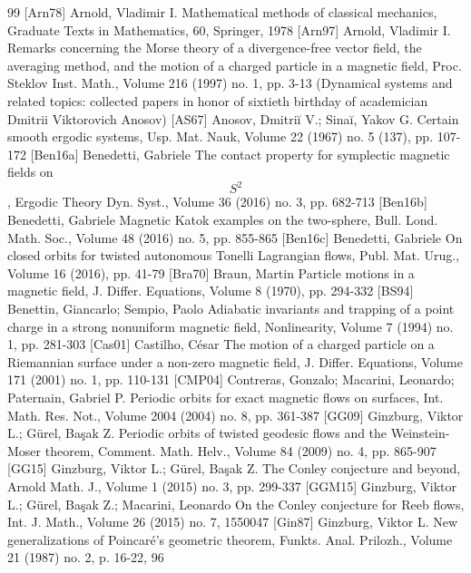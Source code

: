 \begin{thebibliography}{99}
 [Arn78] Arnold, Vladimir I. Mathematical methods of classical mechanics, Graduate Texts in Mathematics, 60, Springer, 1978
 [Arn97] Arnold, Vladimir I. Remarks concerning the Morse theory of a divergence-free vector field, the averaging method, and the motion of a charged particle in a magnetic field, Proc. Steklov Inst. Math., Volume 216 (1997) no. 1, pp. 3-13 (Dynamical systems and related topics: collected papers in honor of sixtieth birthday of academician Dmitrii Viktorovich Anosov)
 [AS67] Anosov, Dmitriĭ V.; Sinaĭ, Yakov G. Certain smooth ergodic systems, Usp. Mat. Nauk, Volume 22 (1967) no. 5 (137), pp. 107-172
 [Ben16a] Benedetti, Gabriele The contact property for symplectic magnetic fields on $${S}^2$$, Ergodic Theory Dyn. Syst., Volume 36 (2016) no. 3, pp. 682-713
 [Ben16b] Benedetti, Gabriele Magnetic Katok examples on the two-sphere, Bull. Lond. Math. Soc., Volume 48 (2016) no. 5, pp. 855-865
 [Ben16c] Benedetti, Gabriele On closed orbits for twisted autonomous Tonelli Lagrangian flows, Publ. Mat. Urug., Volume 16 (2016), pp. 41-79
 [Bra70] Braun, Martin Particle motions in a magnetic field, J. Differ. Equations, Volume 8 (1970), pp. 294-332
 [BS94] Benettin, Giancarlo; Sempio, Paolo Adiabatic invariants and trapping of a point charge in a strong nonuniform magnetic field, Nonlinearity, Volume 7 (1994) no. 1, pp. 281-303
 [Cas01] Castilho, César The motion of a charged particle on a Riemannian surface under a non-zero magnetic field, J. Differ. Equations, Volume 171 (2001) no. 1, pp. 110-131
 [CMP04] Contreras, Gonzalo; Macarini, Leonardo; Paternain, Gabriel P. Periodic orbits for exact magnetic flows on surfaces, Int. Math. Res. Not., Volume 2004 (2004) no. 8, pp. 361-387
 [GG09] Ginzburg, Viktor L.; Gürel, Başak Z. Periodic orbits of twisted geodesic flows and the Weinstein-Moser theorem, Comment. Math. Helv., Volume 84 (2009) no. 4, pp. 865-907
 [GG15] Ginzburg, Viktor L.; Gürel, Başak Z. The Conley conjecture and beyond, Arnold Math. J., Volume 1 (2015) no. 3, pp. 299-337
 [GGM15] Ginzburg, Viktor L.; Gürel, Başak Z.; Macarini, Leonardo On the Conley conjecture for Reeb flows, Int. J. Math., Volume 26 (2015) no. 7, 1550047
 [Gin87] Ginzburg, Viktor L. New generalizations of Poincaré’s geometric theorem, Funkts. Anal. Prilozh., Volume 21 (1987) no. 2, p. 16-22, 96

\end{thebibliography}
